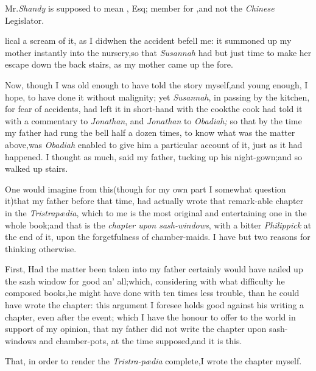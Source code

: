 \documentclass{article}
\begin{document}
\bgroup\footnotesize
\indent\fnast\enspace Mr.\@ \textit{Shandy} is supposed to mean  \break 
{}, Esq; member for ,\tsh and not the\break
\textit{Chinese} Legislator.\par\egroup

\eject\noindent\enlargethispage\baselineskip
lical a scream of it, as I did\tsk when the accident
befell me: it summoned up my mother instantly into the nursery,\tsk so
that \textit{Susannah} had but just time to make her escape down the
back stairs, as my mother came up the fore.

Now, though I was old enough to have told the story
myself,\tsk and young\break
enough, I hope, to have done it without\break
malignity; yet \textit{Susannah}, in passing by the kitchen, for fear
of accidents, had left it in short-hand with the cook\tsk the
cook had told it with a commentary to \textit{Jonathan}, and
\textit{Jonathan} to \textit{Obadiah;} so that by the time my father
had rung the bell half a dozen times, to know what was the matter
above,\tsk was \textit{Obadiah} enabled to give him a
particular account of it, just as it had happened.\tsk\break
I thought as much, said my father, tucking up his
night-gown;\tsk and so walked up stairs.

One would imagine from this\tsh (though for my own part I somewhat
question it)\tsk that my father before that time, had actually wrote
that remark-\break able chapter in the \textit{Tristrapædia}, which to me is
the most original and entertaining one in the whole book;\tsk and that
is\break
the \textit{chapter upon sash-windows}, with a bitter
\textit{Philippick} at the end of it, upon the forgetfulness of
chamber-maids.\tsk\break
I have but two reasons for thinking otherwise.

First, Had the matter been taken into
my father certainly would have nailed up the sash
window for good an’ all;\tsk which, considering with what
difficulty he composed books,\tsk he might have done with ten
times less trouble, than he could have wrote the chapter: this
argument I foresee holds good against his writing a chapter, even
after the event;
which I have the honour to offer to the world in support of my
opinion, that my father did not write the chapter upon sash-windows
and chamber-pots, at the time supposed,\tsk and it is this.


\tsh  That, in order to render the
\textit{Tristra-pædia} complete,\tsk I wrote the chapter
myself.
\end{document}
